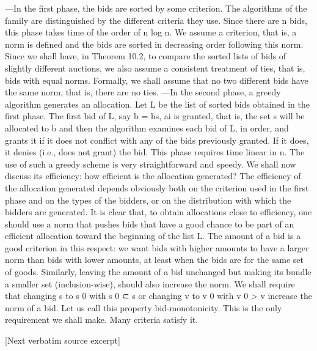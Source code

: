 \documentclass[10pt]{article}
\begin{document}
\begin{ReviewVerbatim}
—In the first phase, the bids are sorted by some criterion. The algorithms of the
family are distinguished by the different criteria they use. Since there are n bids,
this phase takes time of the order of n log n. We assume a criterion, that is, a norm
is defined and the bids are sorted in decreasing order following this norm. Since
we shall have, in Theorem 10.2, to compare the sorted lists of bids of slightly
different auctions, we also assume a consistent treatment of ties, that is, bids
with equal norms. Formally, we shall assume that no two different bids have the
same norm, that is, there are no ties.
—In the second phase, a greedy algorithm generates an allocation. Let L be the
list of sorted bids obtained in the first phase. The first bid of L, say b = hs, ai is
granted, that is, the set s will be allocated to b and then the algorithm examines
each bid of L, in order, and grants it if it does not conflict with any of the bids
previously granted. If it does, it denies (i.e., does not grant) the bid. This phase
requires time linear in n.
The use of such a greedy scheme is very straightforward and speedy. We shall
now discuss its efficiency: how efficient is the allocation generated? The efficiency
of the allocation generated depends obviously both on the criterion used in the first
phase and on the types of the bidders, or on the distribution with which the bidders
are generated. It is clear that, to obtain allocations close to efficiency, one should use
a norm that pushes bids that have a good chance to be part of an efficient allocation
toward the beginning of the list L. The amount of a bid is a good criterion in this respect: we want bids with higher amounts to have a larger norm than bids with lower
amounts, at least when the bids are for the same set of goods. Similarly, leaving the
amount of a bid unchanged but making its bundle a smaller set (inclusion-wise),
should also increase the norm. We shall require that changing s to s 0 with s 0 ⊂ s
or changing v to v 0 with v 0 > v increase the norm of a bid. Let us call this property
bid-monotonicity. This is the only requirement we shall make. Many criteria
satisfy it.

[Next verbatim source excerpt]


\end{ReviewVerbatim}
\end{document}
